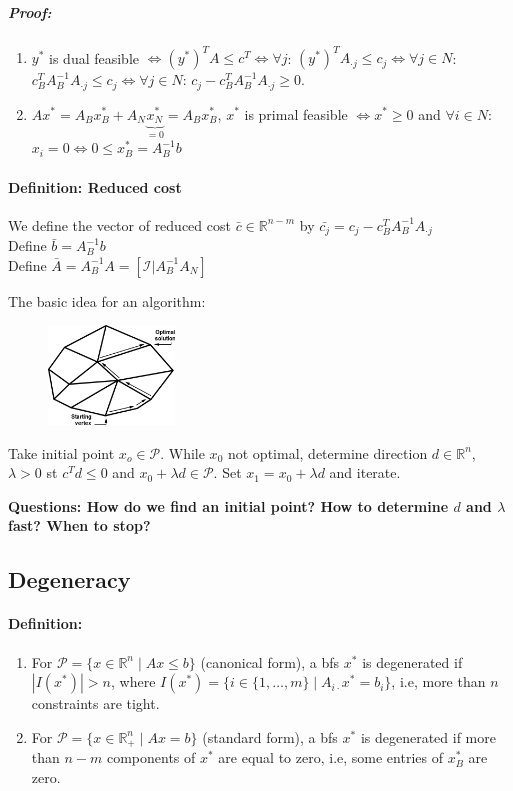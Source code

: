 \documentclass[main]{subfiles}
\begin{document}
\subparagraph{Proof:}
\begin{enumerate}
\item $y^*$ is dual feasible $\iff (y^*)^T A \leq c^T \iff \forall j$:
$(y^*)^T A_{\cdot j} \leq c_j \iff \forall j \in N$: $c^T_B A^{-1}_B
A_{\cdot j} \leq c_j \iff \forall j \in N$: $c_j - c^T_B A^{-1}_B A_{\cdot j}
\geq 0$.
\item $Ax^* = A_B x^*_B + A_N \underbrace{x^*_N}_{=0} = A_B x^*_B$,
$x^*$ is primal feasible $\iff x^* \geq 0$ and $\forall i \in N$:
$x_i = 0 \iff 0 \leq x^*_B = A^{-1}_B b$ 
\end{enumerate}

\paragraph{Definition: Reduced cost}
We define the vector of reduced cost $\bar{c} \in \mathbb{R}^{n - m}$ by
$\bar{c_j} = c_j - c^T_B A^{-1}_B A_{\cdot j}$\\
Define $\bar{b} = A^{-1}_B b$\\
Define $\bar{A} = A^{-1}_B A = [\mathcal{I} | A^{-1}_B A_N ]$

The basic idea for an algorithm:\\
\begin{figure}[!h]
  \label{fig:projection}
  \centering
    \includegraphics[width=0.3\textwidth]{imgs/simplex-description.png}
\end{figure}

Take initial point $x_o \in \mathcal{P}$. While $x_0$ not optimal, determine
direction $d \in \mathbb{R}^n$, $\lambda > 0$ st $c^T d \leq 0$ and
$x_0 + \lambda d \in \mathcal{P}$. Set $x_1 = x_0 + \lambda d$ and iterate.

\textbf{Questions: How do we find an initial point? How to determine $d$ and
$\lambda$ fast? When to stop?}

\subsection{Degeneracy}
\paragraph{Definition:}
\begin{enumerate}
\item For $\mathcal{P} = \{x \in \mathbb{R}^n \mid Ax \leq b\}$ (canonical
form), a bfs $x^*$ is degenerated if $|I(x^*)| > n$, where
$I(x^*) = \{i \in \{1, \dots, m\} \mid A_{i\cdot}x^* = b_i\}$, i.e, more than
$n$ constraints are tight.
\item For $\mathcal{P} = \{x \in \mathbb{R}^n_+ \mid Ax = b\}$ (standard form),
a bfs $x^*$ is degenerated if more than $n-m$ components of $x^*$ are equal to
zero, i.e, some entries of $x^*_B$ are zero.
\end{enumerate}
\end{document}
